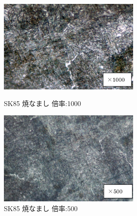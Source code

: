 \documentclass[10pt,a4j]{jsarticle}
\begin{document}
  \begin{figure}[htbp]
    \begin{minipage}{0.5\hsize}
      \begin{center}
        \includegraphics[width=7cm]{../img/S85_yakinamashi_1000.png}
        \caption{SK85 焼なまし 倍率:1000}
      \end{center}
    \end{minipage}
    \begin{minipage}{0.5\hsize}
      \begin{center}
        \includegraphics[width=7cm]{../img/SK85_yakinamashi_500.png}
        \caption{SK85 焼なまし 倍率:500}
      \end{center}
    \end{minipage}
  \end{figure}
\end{document}
